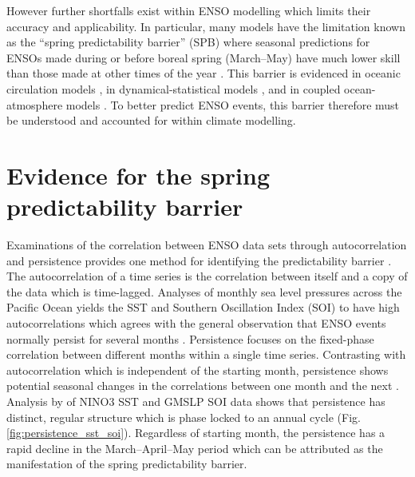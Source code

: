 \documentclass[12pt, onecolumn]{revtex4}    %
\begin{document}
However further shortfalls exist within ENSO modelling which limits their accuracy and applicability. In particular, many models have the limitation known as the ``spring predictability barrier'' (SPB) where seasonal predictions for ENSOs made during or before boreal spring (March--May) have much lower skill than those made at other times of the year \citep{torrence1998annual}. This barrier is evidenced in oceanic circulation models \citep{latif1992much}, in dynamical-statistical models \citep{balmaseda1994enso}, and in coupled ocean-atmosphere models \citep{goswami1991predictability, xue1994prediction}. To better predict ENSO events, this barrier therefore must be understood and accounted for within climate modelling.

\section{Evidence for the spring predictability barrier}

Examinations of the correlation between ENSO data sets through autocorrelation and persistence provides one method for identifying the predictability barrier \citep{torrence1998annual}. The autocorrelation of a time series is the correlation between itself and a copy of the data which is time-lagged. Analyses of monthly sea level pressures across the Pacific Ocean yields the SST and Southern Oscillation Index (SOI) to have high autocorrelations which agrees with the general observation that ENSO events normally persist for several months \citep{trenberth1976spatial}. Persistence focuses on the fixed-phase correlation between different months within a single time series. Contrasting with autocorrelation which is independent of the starting month, persistence shows potential seasonal changes in the correlations between one month and the next \citep{troup1965southern}. Analysis by \cite{torrence1998annual} of NINO3 SST and GMSLP SOI data shows that persistence has distinct, regular structure which is phase locked to an annual cycle (Fig. \ref{fig:persistence_sst_soi}). Regardless of starting month, the persistence has a rapid decline in the March--April--May period which can be attributed as the manifestation of the spring predictability barrier. \\
\end{document}
